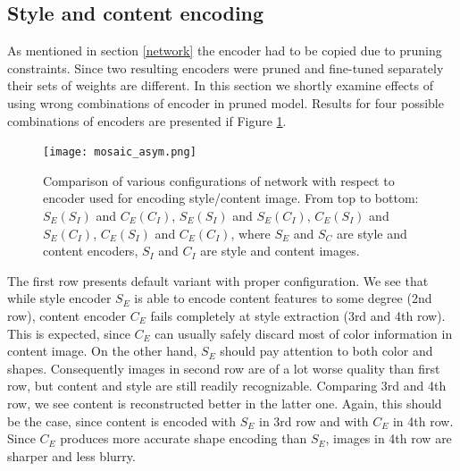 \documentclass[../Main.tex]{subfiles}
\begin{document}
\subsection{Style and content encoding} \label{two_encoders}
As mentioned in section \ref{network} the encoder had to be copied due to pruning
constraints. Since two resulting encoders were pruned and fine-tuned separately 
their sets of weights are different. In this section we shortly examine effects
of using wrong combinations of encoder in pruned model. Results for four possible combinations
of encoders are presented if Figure \ref{fig:mosaic_asym}.

        \begin{figure}[h!]
        \centering
            \texttt{[image: mosaic\_asym.png]}
            \caption{Comparison of various configurations of network with respect
            to encoder used for encoding style/content image. From top to bottom:
            $S_E(S_I)$ and $C_E(C_I)$, $S_E(S_I)$ and $S_E(C_I)$,
            $C_E(S_I)$ and $S_E(C_I)$, $C_E(S_I)$ and $C_E(C_I)$, where
            $S_E$ and $S_C$ are style and content encoders, $S_I$ and $C_I$ are 
            style and content images.
            }
            \label{fig:mosaic_asym}
        \end{figure}
        
The first row presents default variant with proper configuration. 
We see that while style encoder $S_E$ is able to encode content features to some
degree (2nd row), content encoder $C_E$ fails completely at style extraction
(3rd and 4th row). This is expected, since $C_E$ can usually safely
discard most of color information in content image. On the other hand, $S_E$
should pay attention to both color and shapes. Consequently images in second row
are of a lot worse quality than first row, but content and style are still readily
recognizable. Comparing 3rd and 4th row, we see content 
is reconstructed better in the latter one. Again, this should be the case,
since content is encoded with $S_E$ in 3rd row and with $C_E$ in 4th row.
Since $C_E$ produces more accurate shape encoding than $S_E$, images in 4th row are
sharper and less blurry.
\biblio %
\end{document}
